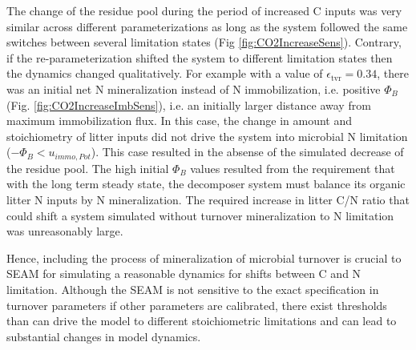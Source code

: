 The change of the residue pool during the period of increased C inputs was very
similar across different parameterizations as long as the system followed the
same switches between several limitation states (Fig \ref{fig:CO2IncreaseSens}).
Contrary, if the re-parameterization shifted the system to different limitation
states then the dynamics changed qualitatively.
For example with a value of $\epsilon_{\operatorname{tvr}}=0.34$, there was an
initial net N mineralization instead of N immobilization, i.e. positive $\Phi_B$
(Fig.
\ref{fig:CO2IncreaseImbSens}), i.e. an initially larger distance away from
maximum immobilization flux. In this case, the change in amount and
stoichiometry of litter inputs did not drive the system into microbial N
limitation ($-\Phi_B < u_{immo,Pot}$). This case resulted in the absense of the
simulated decrease of the residue pool.
The high initial $\Phi_B$ values resulted from the requirement that with the
long term steady state, the decomposer system must balance its organic litter N
inputs by N mineralization. The required increase in litter C/N ratio that could
shift a system simulated without turnover mineralization to N limitation was
unreasonably large.

Hence, including the process of mineralization of microbial turnover is crucial
to SEAM for simulating a reasonable dynamics for shifts between C and N
limitation.
Although the SEAM is not sensitive to the exact specification in turnover
parameters if other parameters are calibrated, there exist thresholds than can
drive the model to different stoichiometric limitations and can lead to
substantial changes in model dynamics.

 

